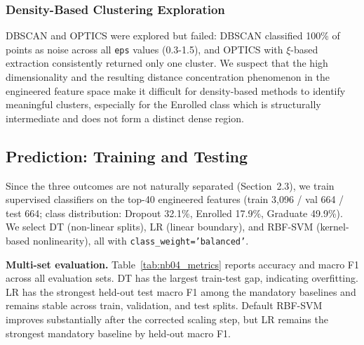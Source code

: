 \documentclass{article}
\begin{document}
\subsubsection{Density-Based Clustering Exploration}

DBSCAN and OPTICS were explored but failed: DBSCAN classified 100\% of points as noise across all \texttt{eps} values (0.3-1.5), and OPTICS with $\xi$-based extraction consistently returned only one cluster. We suspect that the high dimensionality and the resulting distance concentration phenomenon in the engineered feature space make it difficult for density-based methods to identify meaningful clusters, especially for the Enrolled class which is structurally intermediate and does not form a distinct dense region.

\subsection{Prediction: Training and Testing}

Since the three outcomes are not naturally separated (Section~2.3), we train supervised classifiers on the top-40 engineered features (train 3{,}096 / val 664 / test 664; class distribution: Dropout 32.1\%, Enrolled 17.9\%, Graduate 49.9\%). We select DT (non-linear splits), LR (linear boundary), and RBF-SVM (kernel-based nonlinearity), all with \texttt{class\_weight='balanced'}.

\textbf{Multi-set evaluation.} Table~\ref{tab:nb04_metrics} reports accuracy and macro F1 across all evaluation sets. DT has the largest train-test gap, indicating overfitting. LR has the strongest held-out test macro F1 among the mandatory baselines and remains stable across train, validation, and test splits. Default RBF-SVM improves substantially after the corrected scaling step, but LR remains the strongest mandatory baseline by held-out macro F1.
\end{document}
